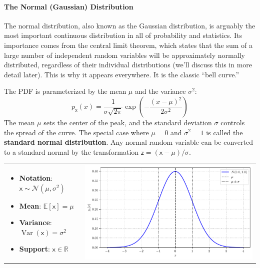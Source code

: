 \paragraph*{The Normal (Gaussian) Distribution}
The normal distribution, also known as the Gaussian distribution, is arguably the most important continuous distribution in all of probability and statistics. Its importance comes from the central limit theorem, which states that the sum of a large number of independent random variables will be approximately normally distributed, regardless of their individual distributions (we'll discuss this in more detail later). This is why it appears everywhere. It is the classic ``bell curve.'' 

The PDF is parameterized by the mean $\mu$ and the variance $\sigma^2$:
\begin{equation}
    p_{\mathsf{x}}(x) = \frac{1}{\sigma\sqrt{2\pi}} \exp\left(-\frac{(x-\mu)^2}{2\sigma^2}\right)
\end{equation}
The mean $\mu$ sets the center of the peak, and the standard deviation $\sigma$ controls the spread of the curve. The special case where $\mu=0$ and $\sigma^2=1$ is called the \textbf{standard normal distribution}. Any normal random variable can be converted to a standard normal by the transformation $\mathsf{z} = (\mathsf{x}-\mu)/\sigma$.

\begin{tabular}{@{}>{\raggedright\arraybackslash}m{} >{\raggedleft\arraybackslash}m{}@{}}
    \begin{itemize}
        \item \textbf{Notation}: $\mathsf{x} \sim \mathcal{N}(\mu, \sigma^2)$
        \item \textbf{Mean}: $\mathbb{E}[\mathsf{x}] = \mu$
        \item \textbf{Variance}: $\operatorname{Var}(\mathsf{x}) = \sigma^2$
        \item \textbf{Support}: $\mathsf{x} \in \mathbb{R}$
    \end{itemize}
    &
    \includegraphics[width=\linewidth]{figs/probability/normal_pdf.pdf} \\
\end{tabular}

